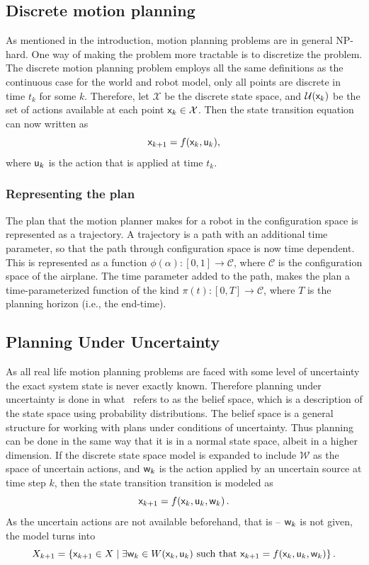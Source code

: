 \subsection{Discrete motion planning}

As mentioned in the introduction, motion planning problems are in general
NP-hard. One way of making the problem more tractable is to discretize the
problem. The discrete motion planning problem employs all the same definitions
as the continuous case for the world and robot model, only all points are
discrete in time \(t_k\) for some \(k\). Therefore, let \(\mathcal{X}\) be the
discrete state space, and \(\mathcal{U}({\mathbf{\mathsf{x}}}_k)\) be the set of actions
available at each point \({\mathbf{\mathsf{x}}}_k \in \mathcal{X}\). Then the state
transition equation can now written as
\[
  {\mathbf{\mathsf{x}}}_{k+1} = f({\mathbf{\mathsf{x}}}_k, {\mathbf{\mathsf{u}}}_k) ,
\]
where \({\mathbf{\mathsf{u}}}_k\) is the action that is applied at time \(t_k\).

\subsubsection{Representing the plan}

The plan that the motion planner makes for a robot in the configuration space is
represented as a trajectory. A trajectory is a path with an additional time
parameter, so that the path through configuration space is now time dependent.
This is represented as a function \(\phi(\alpha) \colon [0,1] \rightarrow
\mathcal{C}\), where \(\mathcal{C}\) is the configuration space of the airplane.
The time parameter added to the path, makes the plan a time-parameterized
function of the kind \(\pi(t) \colon [0,T] \rightarrow \mathcal{C}\), where
\(T\) is the planning horizon (i.e., the end-time).

\subsection{Planning Under Uncertainty}

As all real life motion planning problems are faced with some level of
uncertainty the exact system state is never exactly known. Therefore planning
under uncertainty is done in what~\citeauthor{Lav06} refers to as the belief
space, which is a description of the state space using probability
distributions. The belief space is a general structure for working with plans
under conditions of uncertainty. Thus planning can be done in the same way that
it is in a normal state space, albeit in a higher dimension. If the discrete
state space model is expanded to include \(\mathcal{W}\) as the space of
uncertain actions, and \({\mathbf{\mathsf{w}}}_k\) is the action applied by an uncertain
source at time step \(k\), then the state transition transition is modeled
as~\cite{Lav06}
\[
  {\mathbf{\mathsf{x}}}_{k+1} = f({\mathbf{\mathsf{x}}}_k,{\mathbf{\mathsf{u}}}_k,{\mathbf{\mathsf{w}}}_k) \, .
\]
As the uncertain actions are not available beforehand, that is -- \({\mathbf{\mathsf{w}}}_
k\) is not given, the model turns into
\[
  X_{k+1} = \lbrace {\mathbf{\mathsf{x}}}_{k+1} \in X \mid \exists {\mathbf{\mathsf{w}}}_k \in
    W({\mathbf{\mathsf{x}}}_k,{\mathbf{\mathsf{u}}}_k) \text{ such that } {\mathbf{\mathsf{x}}}_{k+1} =
    f({\mathbf{\mathsf{x}}}_k,{\mathbf{\mathsf{u}}}_k,{\mathbf{\mathsf{w}}}_k)\rbrace \, .
\] 

